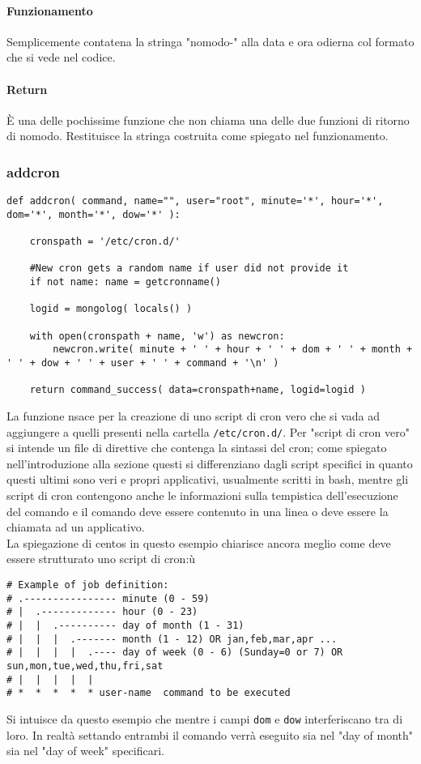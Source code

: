 \documentclass[11pt]{article}
\begin{document}
\paragraph{Funzionamento}
Semplicemente contatena la stringa "nomodo-" alla data e ora odierna col formato che si vede nel codice.
\paragraph{Return}
È una delle pochissime funzione che non chiama una delle due funzioni di ritorno di nomodo.
Restituisce la stringa costruita come spiegato nel funzionamento.

\subsubsection{addcron}\label{addcron}
\begin{lstlisting}
def addcron( command, name="", user="root", minute='*', hour='*', dom='*', month='*', dow='*' ):

    cronspath = '/etc/cron.d/' 

    #New cron gets a random name if user did not provide it
    if not name: name = getcronname()

    logid = mongolog( locals() )

    with open(cronspath + name, 'w') as newcron:
        newcron.write( minute + ' ' + hour + ' ' + dom + ' ' + month + ' ' + dow + ' ' + user + ' ' + command + '\n' )

    return command_success( data=cronspath+name, logid=logid )
\end{lstlisting}
La funzione nsace per la creazione di uno script di cron vero che si vada ad aggiungere a quelli presenti nella cartella
\texttt{/etc/cron.d/}. Per "script di cron vero" si intende un file di direttive che contenga la sintassi del cron; come spiegato
nell'introduzione alla sezione  questi si differenziano dagli script specifici in quanto questi ultimi sono
veri e propri applicativi, usualmente scritti in bash, mentre gli script di cron contengono anche le informazioni
sulla tempistica dell'esecuzione del comando e il comando deve essere contenuto in una linea o deve essere la chiamata
ad un applicativo.\\
La spiegazione di centos in questo esempio chiarisce ancora meglio come deve essere strutturato uno script di cron:ù
\begin{lstlisting}
# Example of job definition:
# .---------------- minute (0 - 59)
# |  .------------- hour (0 - 23)
# |  |  .---------- day of month (1 - 31)
# |  |  |  .------- month (1 - 12) OR jan,feb,mar,apr ...
# |  |  |  |  .---- day of week (0 - 6) (Sunday=0 or 7) OR sun,mon,tue,wed,thu,fri,sat
# |  |  |  |  |
# *  *  *  *  * user-name  command to be executed
\end{lstlisting}
Si intuisce da questo esempio che mentre i campi \texttt{dom} e \texttt{dow} interferiscano tra di loro. In realtà
settando entrambi il comando verrà eseguito sia nel "day of month" sia nel "day of week" specificari.
\end{document}
